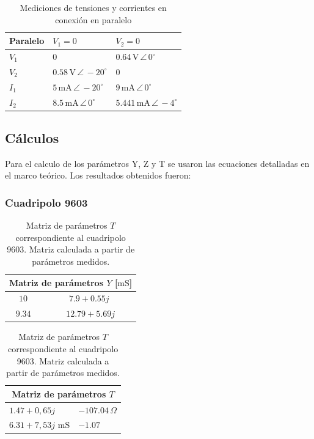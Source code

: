 \begin{table}[H]
\centering
\begin{tabular}{|l|l|l|}
\hline
\textbf{Paralelo} & $V_1 = 0$ & $V_2 = 0$ \\ \hline
$V_1$ & $0$ & $0.64\,\mathrm{V}\,\angle\,0^\circ$ \\ \hline
$V_2$ & $0.58\,\mathrm{V}\,\angle\,-20^\circ$ & $0$ \\ \hline
$I_1$ & $5\,\mathrm{mA}\,\angle\,-20^\circ$ & $9\,\mathrm{mA}\,\angle\,0^\circ$ \\ \hline
$I_2$ & $8.5\,\mathrm{mA}\,\angle\,0^\circ$ & $5.441\,\mathrm{mA}\,\angle\,-4^\circ$ \\ \hline
\end{tabular}
\caption{Mediciones de tensiones y corrientes en conexión en paralelo}
\label{tab:corrientes_tensiones_paralelo}
\end{table}


     
    \subsection{Cálculos}

	Para el calculo de los parámetros Y, Z y T se usaron las ecuaciones detalladas en el marco teórico. Los resultados obtenidos fueron:
	
	\subsubsection*{Cuadripolo 9603}
	
	\begin{table}[H]
\centering
\begin{minipage}{0.48\textwidth}
\centering
\begin{tabular}{|c|c|}
\hline
\multicolumn{2}{|c|}{\textbf{Matriz de parámetros $Y$ [$\mathrm{mS}$]}} \\ \hline
$10      \,$ & $7.9 + 0.55j\,$ \\ \hline
$9.34      \,$ & $  $  $12.79 + 5.69j\,$ \\ \hline
\end{tabular}
\caption{Matriz de parámetros $Y$ correspondiente al cuadripolo 9603. Matriz calculada a partir de parámetros medidos.}
\label{tab:matriz_Y9603}
\end{minipage}
\hfill
\begin{minipage}{0.48\textwidth}
\centering
\begin{tabular}{|l|l|}
\hline
\multicolumn{2}{|c|}{\textbf{Matriz de parámetros $T$}} \\ \hline
$1.47 + 0,65j$ & $-107.04\,\Omega$ \\ \hline
$6.31 + 7,53j$ $ \mathrm{mS} $ & $-1.07$ \\ \hline
\end{tabular}
\caption{Matriz de parámetros $T$ correspondiente al cuadripolo 9603. Matriz calculada a partir de parámetros medidos.}
\label{tab:matriz_T9603}
\end{minipage}
\end{table}

